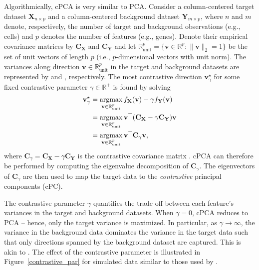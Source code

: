Algorithmically, cPCA is very similar to PCA. Consider a column-centered target dataset $\mathbf{X}_{n \times p}$ and a column-centered background dataset $\mathbf{Y}_{m \times p}$, where $n$ and $m$ denote, respectively, the number of target and background observations (e.g., cells) and $p$ denotes the number of features (e.g., genes). Denote their empirical covariance matrices by $\mathbf{C_X}$ and $\mathbf{C_Y}$ and let $\mathbb{R}_{\text{unit}}^p=\{\mathbf{v} \in \mathbb{R}^p: \lVert\mathbf{v}\rVert_2 = 1\}$ be the set of unit vectors of length $p$ (i.e., $p$-dimensional vectors with unit norm). The variances along direction $\mathbf{v} \in \mathbb{R}_{\text{unit}}^p$ in the target and background datasets are represented by  and , respectively. The most contrastive direction $\mathbf{v}^{\star}_\gamma$ for some fixed contrastive parameter $\gamma \in \mathbb{R}^+$ is found by solving
\begin{equation}
    \begin{aligned}
  \mathbf{v}^{\star}_\gamma & = \operatorname*{argmax}_{\mathbf{v} \in \mathbb{R}_{\text{unit}}^p}
  {f_{\mathbf{X}}(\mathbf{v})-
    \gamma f_{\mathbf{Y}}(\mathbf{v})} \\
  & = \operatorname*{argmax}_{\mathbf{v} \in \mathbb{R}_{\text{unit}}^p}
    \mathbf{v}^\top(\mathbf{C_X} - \gamma\mathbf{C_Y})\mathbf{v} \\
  & = \operatorname*{argmax}_{\mathbf{v} \in \mathbb{R}_{\text{unit}}^p}
    \mathbf{v}^\top\mathbf{C}_{\gamma}\mathbf{v},
\end{aligned}
\end{equation}
where $\mathbf{C}_{\gamma} =  \mathbf{C_X} - \gamma\mathbf{C_Y}$ is the contrastive covariance matrix \citep{Abid2018}. cPCA can therefore be performed by computing the eigenvalue decomposition of $\mathbf{C}_{\gamma}$. The eigenvectors of $\mathbf{C}_{\gamma}$ are then used to map the target data to the \textit{contrastive} principal components (cPC).

The contrastive parameter $\gamma$ quantifies the trade-off between each feature's variances in the target and background datasets. When $\gamma = 0$, cPCA reduces to PCA -- hence, only the target variance  is maximized.  In particular, as $\gamma \rightarrow \infty$, the variance in the background data dominates the variance in the target data such that only directions spanned by the background dataset are captured. This is akin to  \citep{Abid2018}. The effect of the contrastive parameter is illustrated in Figure~\ref{contrastive_par} for simulated data similar to those used by \citet{Abid2018}.

